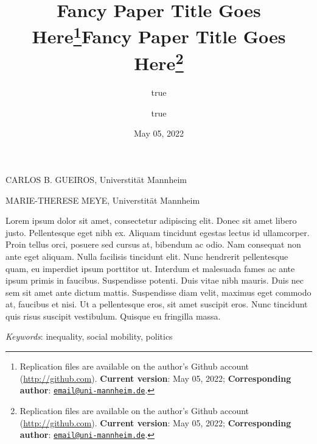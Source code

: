 \documentclass[
  11pt,
]{article}
\title{Fancy Paper Title Goes Here\thanks{Replication files are
available on the author's Github account (\url{http://github.com}).
\textbf{Current version}: May 05, 2022; \textbf{Corresponding author}:
\href{mailto:email@uni-mannheim.de}{\nolinkurl{email@uni-mannheim.de}}.}}
\author{true \and true}
\date{May 05, 2022}
\title{Fancy Paper Title Goes Here\thanks{Replication files are
available on the author's Github account (\url{http://github.com}).
\textbf{Current version}: May 05, 2022; \textbf{Corresponding author}:
\href{mailto:email@uni-mannheim.de}{\nolinkurl{email@uni-mannheim.de}}.}  }
\date{}
\renewenvironment{abstract}
 {{%
    \setlength{\leftmargin}{0mm}
    \setlength{\rightmargin}{\leftmargin}%
  }%
  \relax}
 {\endlist}
\begin{document}



{%
\setlength{\parindent}{0pt}
\thispagestyle{plain}
{%
\maketitle  %

}




{
   \vskip 13.5pt\relax \normalsize\fontsize{11}{12}
   \MakeUppercase{Carlos B. Gueiros}, \small{Universtität
Mannheim}   \par \vskip -3.5pt \MakeUppercase{Marie-Therese
Meye}, \small{Universtität Mannheim}   

}

}








\begin{abstract}


    \vskip 8.5pt %

\noindent \small{Lorem ipsum dolor sit amet, consectetur adipiscing
elit. Donec sit amet libero justo. Pellentesque eget nibh ex. Aliquam
tincidunt egestas lectus id ullamcorper. Proin tellus orci, posuere sed
cursus at, bibendum ac odio. Nam consequat non ante eget aliquam. Nulla
facilisis tincidunt elit. Nunc hendrerit pellentesque quam, eu imperdiet
ipsum porttitor ut. Interdum et malesuada fames ac ante ipsum primis in
faucibus. Suspendisse potenti. Duis vitae nibh mauris. Duis nec sem sit
amet ante dictum mattis. Suspendisse diam velit, maximus eget commodo
at, faucibus et nisi. Ut a pellentesque eros, sit amet suscipit eros.
Nunc tincidunt quis risus suscipit vestibulum. Quisque eu fringilla
massa.}


\vskip 8.5pt \noindent \emph{Keywords}: inequality, social mobility,
politics \par




\end{abstract}
\end{document}

